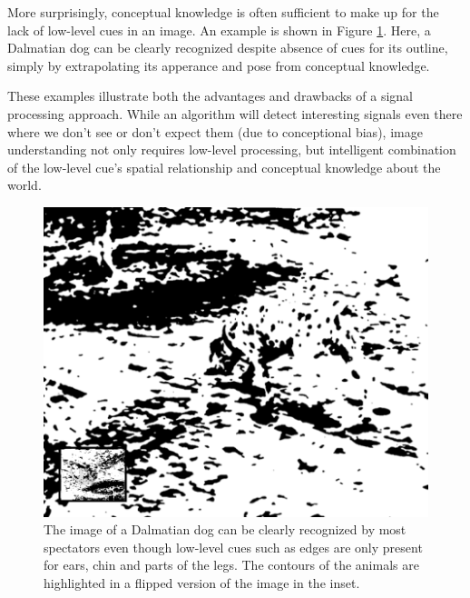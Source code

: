 More surprisingly, conceptual knowledge is often sufficient to make up for the lack of low-level cues in an image. An example is shown in Figure \ref{fig:dalmatian}. Here, a Dalmatian dog can be clearly recognized despite absence of cues for its outline, simply by extrapolating its apperance and pose from conceptual knowledge. 

These examples illustrate both the advantages and drawbacks of a signal processing approach. While an algorithm will detect interesting signals even there where we don't see or don't expect them (due to conceptional bias), image understanding not only requires low-level processing, but intelligent combination of the low-level cue's spatial relationship and conceptual knowledge about the world. 


\begin{figure}
	\centering
		\includegraphics[width=\textwidth]{figs/dalmatian}
	\caption{The image of a Dalmatian dog can be clearly recognized by most spectators even though low-level cues such as edges are only present for ears, chin and parts of the legs. The contours of the animals are highlighted in a flipped version of the image in the inset.
	\label{fig:dalmatian}}
\end{figure}


